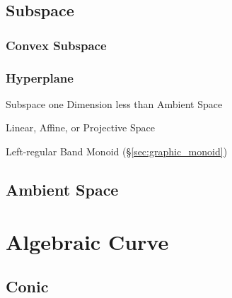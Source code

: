 \subsection{Subspace}\label{sec:subspace}




\subsubsection{Convex Subspace}\label{sec:convex_subspace}

\subsubsection{Hyperplane}\label{sec:hyperplane}

Subspace one Dimension less than Ambient Space

Linear, Affine, or Projective Space %

Left-regular Band Monoid (\S\ref{sec:graphic_monoid})



\subsection{Ambient Space}\label{sec:ambient_space}




\section{Algebraic Curve}\label{sec:algebraic_curve}

\subsection{Conic}\label{sec:conic}

